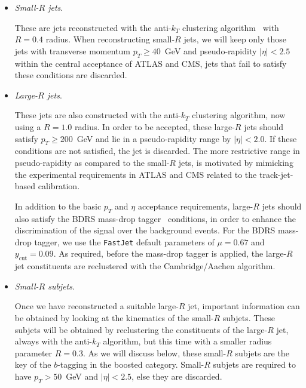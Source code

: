 \begin{itemize}
\item {\it Small-$R$ jets}.

  These are jets  reconstructed with the
  anti-$k_T$ clustering algorithm~\cite{Cacciari:2008gp} with $R=0.4$ radius.
  When reconstructing small-$R$ jets, we will keep only
  those jets with transverse momentum $p_T \ge 40$~GeV
  and pseudo-rapidity $|\eta|<2.5$ within the central
  acceptance of ATLAS and CMS, jets that fail to satisfy these
  conditions are discarded.
    

\item {\it Large-$R$ jets}.

  These jets are also constructed with the
  anti-$k_T$ clustering algorithm, now using a $R=1.0$ radius.
  In order to be accepted, these large-$R$ jets should
  satisfy  $p_T \ge 200$~GeV and lie in a pseudo-rapidity range by
  $|\eta|<2.0$.
  If these conditions are not satisfied, the jet is discarded.
  The more restrictive range  in pseudo-rapidity
  as compared to the small-$R$ jets,
  is motivated by mimicking the  experimental requirements
  in ATLAS and CMS
  related to the track-jet-based calibration.

  In addition to the basic $p_T$ and $\eta$
  acceptance requirements, large-$R$ jets should also
  satisfy the  BDRS mass-drop tagger~\cite{Butterworth:2008iy}
  conditions, in order
  to enhance the discrimination of the signal over the background
  events.
  For the BDRS mass-drop tagger, we use the {\tt FastJet} default
  parameters of  $\mu = 0.67$ and $y_{\textrm{cut}}= 0.09$.
  As required, before the mass-drop tagger is applied, the large-$R$ jet
  constituents are reclustered with the Cambridge/Aachen
  algorithm.


  
\item {\it Small-$R$ subjets}.

  Once we have reconstructed a suitable large-$R$ jet, important
  information can be obtained by looking at the kinematics of
  the small-$R$ subjets.
  These subjets will be obtained by reclustering the constituents
  of the large-$R$ jet, always with the  anti-$k_T$ algorithm,
  but this time with a smaller radius parameter $R=0.3$.
  As we will discuss below, these small-$R$ subjets are the key of
  the $b$-tagging in the boosted category.
  Small-$R$ subjets are required to have $p_T > 50$~GeV and $|\eta|<2.5$,
  else they are discarded.

  \end{itemize}


